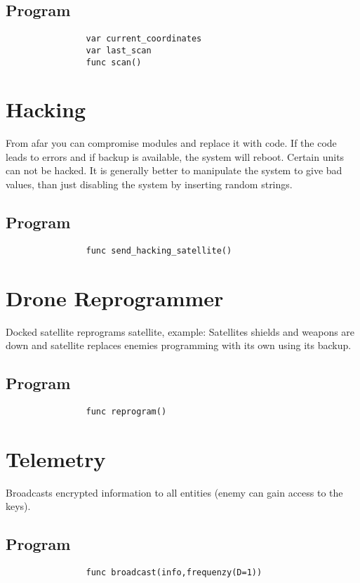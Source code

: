 \documentclass[a4paper]{scrreprt}
\begin{document}
        \subsection{Program}
            \begin{verbatim}
                var current_coordinates
                var last_scan
                func scan()
            \end{verbatim}
    \section{Hacking}
        From afar you can compromise modules and replace it with code.
        If the code leads to errors and if backup is available, the system will reboot.
        Certain units can not be hacked.
        It is generally better to manipulate the system to give bad values, than just disabling the system by inserting random strings.
        \subsection{Program}
            \begin{verbatim}
                func send_hacking_satellite()
            \end{verbatim}
    \section{Drone Reprogrammer}
        Docked satellite reprograms satellite, example: Satellites shields and weapons are down and satellite replaces enemies programming with its own using its backup.
        \subsection{Program}
            \begin{verbatim}
                func reprogram()
            \end{verbatim}
    \section{Telemetry}
        Broadcasts encrypted information to all entities (enemy can gain access to the keys).
        \subsection{Program}
            \begin{verbatim}
                func broadcast(info,frequenzy(D=1))
            \end{verbatim}
\end{document}
